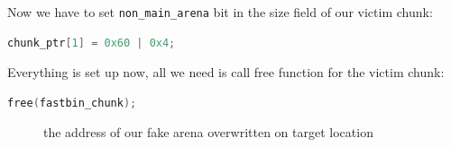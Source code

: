 \documentclass{masterthesis}
\begin{document}
Now we have to set \lstinline{non_main_arena} bit in the size field of our victim chunk:

\begin{lstlisting}[language=c,frame=tlrb]
chunk_ptr[1] = 0x60 | 0x4;
\end{lstlisting}

Everything is set up now, all we need is call free function for the victim chunk:

\begin{lstlisting}[language=c,frame=tlrb]
free(fastbin_chunk);
\end{lstlisting}

\begin{figure}[h!]
\caption{the address of our fake arena overwritten on target location}
\label{fig:fakearens}
\end{figure}
\end{document}
